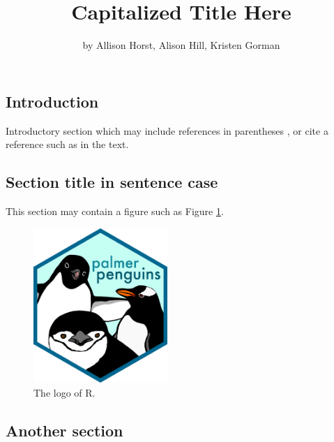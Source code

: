 \title{Capitalized Title Here}
\author{by Allison Horst, Alison Hill, Kristen Gorman}

\maketitle


\hypertarget{introduction}{%
\subsection{Introduction}\label{introduction}}

Introductory section which may include references in parentheses
\citep{R}, or cite a reference such as \citet{R} in the text.

\hypertarget{section-title-in-sentence-case}{%
\subsection{Section title in sentence
case}\label{section-title-in-sentence-case}}

This section may contain a figure such as Figure \ref{fig:Rlogo}.

\begin{Schunk}
\begin{figure}[htbp]

{\centering \includegraphics[width=2in]{palmerpenguins-logo} 

}

\caption[The logo of R]{The logo of R.}\label{fig:Rlogo}
\end{figure}
\end{Schunk}

\hypertarget{another-section}{%
\subsection{Another section}\label{another-section}}

